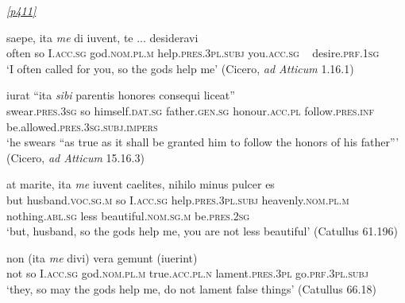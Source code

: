 \hyperlink{p411}{\emph{[p411]}}

\begin{exe}
\ex
\gll saepe, ita \emph{me} di iuvent, te ... desideravi\\
often so I.\textsc{acc.sg} god.\textsc{nom.pl.m} help.\textsc{pres.3pl.subj} you.\textsc{acc.sg} ~ desire.\textsc{prf.1sg}\\
\trans `I often called for you, so the gods help me’ (Cicero, \textit{ad Atticum} 1.16.1)
\label{assertionFormulae5}
\end{exe}

\begin{exe}
\ex
\gll iurat ``ita \emph{sibi} parentis honores consequi liceat''\\
swear.\textsc{pres.3sg} so himself.\textsc{dat.sg} father.\textsc{gen.sg} honour.\textsc{acc.pl} follow.\textsc{pres.inf} be.allowed.\textsc{pres.3sg.subj.impers}\\
\trans `he swears ``as true as it shall be granted him to follow the honors of his father''' (Cicero, \textit{ad Atticum} 15.16.3)
\label{assertionFormulae6}
\end{exe}%

\begin{exe}
\ex
\gll at marite, ita \emph{me} iuvent caelites, nihilo minus pulcer es\\ 
but husband.\textsc{voc.sg.m} so I.\textsc{acc.sg} help.\textsc{pres.3pl.subj} heavenly.\textsc{nom.pl.m} nothing.\textsc{abl.sg} less beautiful.\textsc{nom.sg.m} be.\textsc{pres.2sg}\\
\trans `but, husband, so the gods help me, you are not less beautiful’ (Catullus 61.196)
\label{assertionFormulae7}
\end{exe}%

\begin{exe}
\ex
\gll non (ita \emph{me} divi) vera gemunt (iuerint)\\
not so I.\textsc{acc.sg} god.\textsc{nom.pl.m} true.\textsc{acc.pl.n} lament.\textsc{pres.3pl} go.\textsc{prf.3pl.subj}\\
\trans `they, so may the gods help me, do not lament false things’ (Catullus 66.18)
\label{assertionFormulae8}
\end{exe}%

